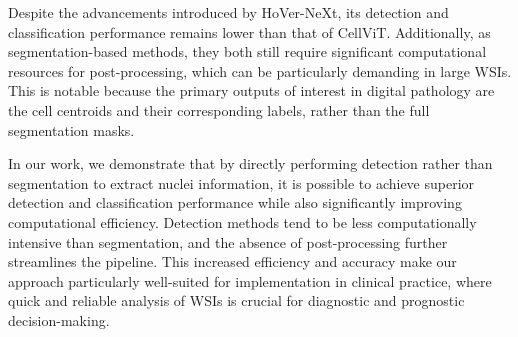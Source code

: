 Despite the advancements introduced by HoVer-NeXt, its detection and classification performance remains lower than that of CellViT. Additionally, as segmentation-based methods, they both still require significant computational resources for post-processing, which can be particularly demanding in large WSIs. This is notable because the primary outputs of interest in digital pathology are the cell centroids and their corresponding labels, rather than the full segmentation masks.

In our work, we demonstrate that by directly performing detection rather than segmentation to extract nuclei information, it is possible to achieve superior detection and classification performance while also significantly improving computational efficiency. Detection methods tend to be less computationally intensive than segmentation, and the absence of post-processing further streamlines the pipeline. This increased efficiency and accuracy make our approach particularly well-suited for implementation in clinical practice, where quick and reliable analysis of WSIs is crucial for diagnostic and prognostic decision-making.